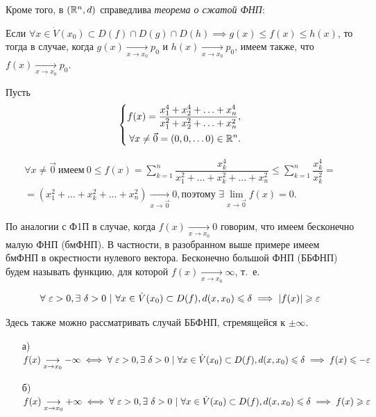 \documentclass[../../main.tex]{subfiles}
\begin{document}
Кроме того, в $(\mathbb{R}^n, d)$ справедлива \emph{теорема о сжатой ФНП}:

Если $\forall x \in \dot{V}(x_0) \subset D(f) \cap D(g) \cap D(h) \implies
g(x) \leq f(x) \leq h(x)$, то тогда в случае, когда
$g(x)\underset{x \to x_0}{\longrightarrow}p_0
$ и $h(x)\underset{x \to x_0}{\longrightarrow}p_0$,
имеем также, что $f(x)\underset{x \to x_0}{\longrightarrow}p_0$.

\begin{exmp}

Пусть \[ \left\{\begin{aligned}
	f(x) = \dfrac{x_1^4 + x_2^4 + \ldots + x_n^4}{x_1^2 + x_2^2 +
		\ldots + x_n^2}, \\
	\forall x \ne \vec{0} = (0, 0, \ldots 0) \in \mathbb{R}^n.
\end{aligned}\right. \]

\begin{gather*}
	\forall x \ne \vec{0}\ \text{имеем}\ 0 \leq f(x) =
	\displaystyle\sum_{k=1}^{n}{\dfrac{x_k^4}{x_1^2 + \dots + x_k^2 +
			\ldots + x_n^2}} \le
	\displaystyle\sum_{k=1}^{n}{\dfrac{x_k^4}{x_k^2}} = \\ =
	(x_1^2 + \ldots + x_k^2 + \ldots + x_n^2)
	\underset{x \to \vec{0}}{\longrightarrow}0, \text{поэтому }
	\exists\displaystyle\lim_{x \to \vec{0}}f(x) = 0.
\end{gather*}

\end{exmp}

По аналогии с Ф1П в случае, когда $f(x)\underset{x \to x_0}{\longrightarrow}0$
говорим, что имеем бесконечно малую ФНП (бмФНП). В частности,
в разобранном выше примере имеем бмФНП в окрестности нулевого вектора.
Бесконечно большой ФНП (ББФНП) будем называть функцию,
для которой $f(x)\underset{x \to x_0}{\longrightarrow}\infty$, т.~е.

\[\forall\ \eps > 0, \exists\ \delta > 0\ |\ 
\forall x \in \dot{V}(x_0) \subset D(f), d(x, x_0) \leq \delta
\implies |f(x)| \geq \eps\]

Здесь также можно рассматривать случай ББФНП, стремящейся к $\pm \infty$.
\begin{itemize}
	\item[а)] $f(x)\underset{x \to x_0}{\longrightarrow} -\infty \iff
	\forall\ \eps > 0, \exists\ \delta > 0\ |\ 
	\forall x \in \dot{V}(x_0) \subset D(f), d(x, x_0) \leq \delta
	\implies f(x) \leq -\eps$
	\item[б)] $f(x)\underset{x \to x_0}{\longrightarrow} +\infty \iff
	\forall\ \eps > 0, \exists\ \delta > 0\ |\ 
	\forall x \in \dot{V}(x_0) \subset D(f), d(x, x_0) \leq \delta
	\implies f(x) \geq \eps$
\end{itemize}
\end{document}
